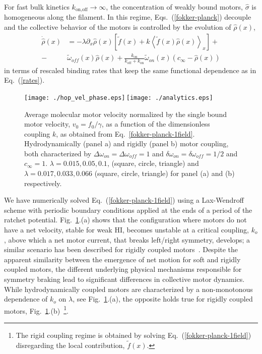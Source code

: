 \documentclass[prl,aps,twocolumn, floatfix, superscriptaddress,showpacs]{revtex4}
\begin{document}
For fast bulk kinetics $k_{\mbox{on,off}}\rightarrow\infty$,  the concentration of weakly bound motors, $\hat\sigma$ is homogeneous along the filament. In this regime, Eqs.~(\ref{fokker-planck}) decouple and the collective behavior of the motors is controlled by the  evolution of $\hat\rho(x)$, 
\begin{align}
 \dot{\hat\rho}(x)&=-\lambda\partial_{x}\hat\rho(x) \left[\tilde f(x)+k\left\langle  \tilde f(x) \hat\rho(x) \right\rangle _{x}\right]+\nonumber\\
-&\tilde{\omega}_{off}(x)\hat\rho(x)+\frac{k_{\mbox{on}}}{k_{\mbox{off}}+k_{\mbox{on}}}\tilde{\omega}_{on}(x)\left(c_\infty-\hat\rho(x)\right)
\label{fokker-planck-1field}
\end{align}
in terms of  rescaled  binding rates that keep the same functional dependence as in Eq.~(\ref{rates}).
\begin{figure}
 \texttt{[image: ./hop\_vel\_phase.eps]}\,\texttt{[image: ./analytics.eps]}
 \caption{Average molecular motor velocity normalized by the single bound motor velocity, $v_0=f_0/\gamma$, as a function of the dimensionless coupling $k$, as obtained from Eq.~\ref{fokker-planck-1field}. Hydrodynamically (panel a) and rigidly  (panel b) motor coupling, both characterized by $\Delta\omega_{on}=\Delta\omega_{off}=1$ and $\delta\omega_{on}=\delta\omega_{off}=1/2$ and $c_\infty=1$.   $\lambda=0.015,0.05,0.1$, (square, circle, triangle) and  $\lambda=0.017,0.033,0.066$ (square, circle, triangle) for panel (a) and (b) respectively.}
 \label{fig1}
\end{figure}
We have numerically solved Eq.~(\ref{fokker-planck-1field}) using a Lax-Wendroff scheme with periodic boundary conditions applied at the ends of a period of the ratchet potential. Fig.~\ref{fig1}.(a) shows that the configuration where motors  do not have a net velocity, stable for weak HI, becomes unstable  at a critical coupling, $k_o$, above which  a net motor current, that breaks left/right  symmetry, develops;  a similar scenario has been described for  rigidly coupled motors~\cite{Guerin2011}. Despite the apparent similarity between the emergence of net motion for soft and rigidly coupled motors,  the different underlying physical mechanisms responsible for symmetry braking lead to significant differences in collective motor dynamics. 
While hydrodynamically coupled motors are characterized by a non-monotonous dependence of $k_o$ on $\lambda$, see Fig.~\ref{fig1}.(a), the opposite holds true for rigidly coupled motors, Fig.~\ref{fig1}.(b)~\footnote{The rigid coupling regime is obtained by solving Eq.~(\ref{fokker-planck-1field}) disregarding  the local contribution, $\tilde f(x)$.}. 
\end{document}

